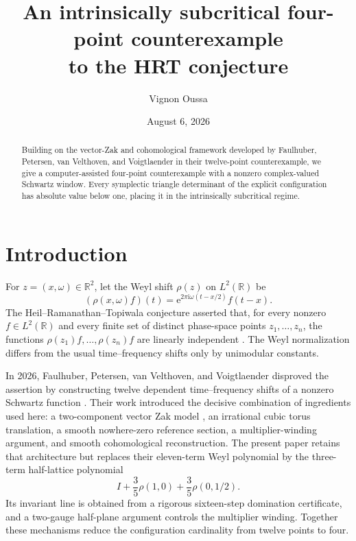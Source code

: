 \documentclass[11pt,reqno]{amsart}
\title[An intrinsically subcritical four-point counterexample]
  {An intrinsically subcritical four-point counterexample\\
   to the HRT conjecture}
\author{Vignon Oussa}
\date{August 6, 2026}
\numberwithin{equation}{section}
\theoremstyle{definition}
\newcommand{\R}{\mathbb R}
\newcommand{\e}{\mathrm e}
\newcommand{\ii}{\mathrm i}
\begin{document}
\begin{abstract}
Building on the vector-Zak and cohomological framework developed by
Faulhuber, Petersen, van Velthoven, and Voigtlaender in their twelve-point
counterexample, we give a computer-assisted four-point counterexample with a
nonzero complex-valued Schwartz window.  Every symplectic triangle determinant
of the explicit configuration has absolute value below one, placing it in the
intrinsically subcritical regime.
\end{abstract}

\maketitle

\section{Introduction}

For $z=(x,\omega)\in\R^2$, let the Weyl shift $\rho(z)$ on $L^2(\R)$ be
\begin{equation}\label{eq:weyl-definition}
  (\rho(x,\omega)f)(t)
  =\e^{2\pi\ii\omega(t-x/2)}f(t-x).
\end{equation}
The Heil--Ramanathan--Topiwala conjecture asserted that, for every nonzero
$f\in L^2(\R)$ and every finite set of distinct phase-space points
$z_1,\dots,z_n$, the functions $\rho(z_1)f,\dots,\rho(z_n)f$ are linearly
independent \cite{HRT}.  The Weyl normalization differs from the usual
time--frequency shifts only by unimodular constants.

In 2026, Faulhuber, Petersen, van Velthoven, and Voigtlaender disproved the
assertion by constructing twelve dependent time--frequency shifts of a
nonzero Schwartz function \cite{FPPV2026}.  Their work introduced the decisive
combination of ingredients used here: a two-component vector Zak model
\cite{ZibZee97}, an irrational
cubic torus translation, a smooth nowhere-zero reference section, a
multiplier-winding argument, and smooth cohomological reconstruction.  The
present paper retains that architecture but replaces their eleven-term Weyl
polynomial by the three-term half-lattice polynomial
\begin{equation}\label{eq:lattice-polynomial-intro}
  I+\frac35\rho(1,0)+\frac35\rho(0,1/2).
\end{equation}
Its invariant line is obtained from a rigorous sixteen-step domination
certificate, and a two-gauge half-plane argument controls the multiplier
winding.  Together these mechanisms reduce the configuration cardinality
from twelve points to four.
\end{document}
